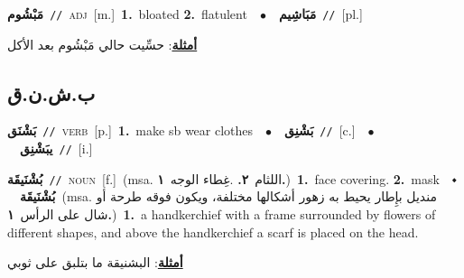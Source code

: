 \documentclass[10pt,a4paper,twoside]{article} %
\begin{document}
\begin{multicols}{2}
{\setlength\topsep{0pt}\textbf{\foreignlanguage{arabic}{مَبْشُوم}}\ {\color{gray}\texttt{//}\color{black}}\ \textsc{adj}\ [m.]\ \textbf{1.}~bloated  \textbf{2.}~flatulent\ \ $\bullet$\ \ \setlength\topsep{0pt}\textbf{\foreignlanguage{arabic}{مَبَاشِيم}}\ {\color{gray}\texttt{//}\color{black}}\ [pl.]\  \begin{flushright}\color{gray}\foreignlanguage{arabic}{\textbf{\underline{\foreignlanguage{arabic}{أمثلة}}}: حسِّيت حالي مَبْشُوم بعد الأكل}\end{flushright}\color{black}} \vspace{2mm}

\vspace{-3mm}
\subsection*{\color{blue}\foreignlanguage{arabic}{ب.ش.ن.ق}\color{blue}{}} 

{\setlength\topsep{0pt}\textbf{\foreignlanguage{arabic}{بَشْنَق}}\ {\color{gray}\texttt{//}\color{black}}\ \textsc{verb}\ [p.]\ \textbf{1.}~make sb wear clothes\ \ $\bullet$\ \ \setlength\topsep{0pt}\textbf{\foreignlanguage{arabic}{بَشْنِق}}\ {\color{gray}\texttt{//}\color{black}}\ [c.]\ \ $\bullet$\ \ \setlength\topsep{0pt}\textbf{\foreignlanguage{arabic}{يبَشْنِق}}\ {\color{gray}\texttt{//}\color{black}}\ [i.]\ } \vspace{2mm}

{\setlength\topsep{0pt}\textbf{\foreignlanguage{arabic}{بُشْنَيقَة}}\ {\color{gray}\texttt{//}\color{black}}\ \textsc{noun}\ [f.]\ \color{gray}(msa. \foreignlanguage{arabic}{اللثام}~\foreignlanguage{arabic}{\textbf{٢.}}  .\foreignlanguage{arabic}{غِطاء الوجه}~\foreignlanguage{arabic}{\textbf{١.}})\color{black}\ \textbf{1.}~face covering.  \textbf{2.}~mask\ \ $\smblkdiamond$\ \ \setlength\topsep{0pt}\textbf{\foreignlanguage{arabic}{بُشْنَيقَة}}\ \color{gray}(msa. \foreignlanguage{arabic}{منديل بإِطار يحيط به زهور أشكالها مختلفة، ويكون فوقه طرحة أو شال على الرأس}~\foreignlanguage{arabic}{\textbf{١.}})\color{black}\ \textbf{1.}~a handkerchief with a frame surrounded by flowers of different shapes, and above the handkerchief a scarf is placed on the head.\  \begin{flushright}\color{gray}\foreignlanguage{arabic}{\textbf{\underline{\foreignlanguage{arabic}{أمثلة}}}: البشنيقة ما بتلبق على ثوبي}\end{flushright}\color{black}} \vspace{2mm}


\end{multicols}
\end{document}
